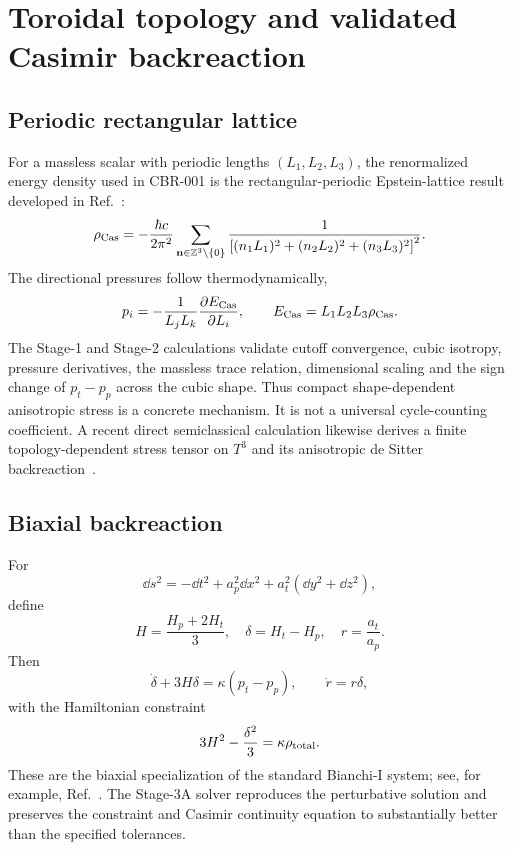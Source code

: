\section{Toroidal topology and validated Casimir backreaction}

\subsection{Periodic rectangular lattice}

For a massless scalar with periodic lengths $(L_1,L_2,L_3)$, the renormalized
energy density used in CBR-001 is the rectangular-periodic Epstein-lattice
result developed in Ref.~\cite{edery2006}:
\begin{equation}
 \rho_{\rm Cas}=-\frac{\hbar c}{2\pi^2}
 \sum_{\mathbf n\in\mathbb Z^3\setminus\{0\}}
 \frac{1}{\left[(n_1L_1)^2+(n_2L_2)^2+(n_3L_3)^2\right]^2}.
 \label{eq:casimir-lattice}
\end{equation}
The directional pressures follow thermodynamically,
\begin{equation}
 p_i=-\frac{1}{L_jL_k}\frac{\partial E_{\rm Cas}}{\partial L_i},
 \qquad E_{\rm Cas}=L_1L_2L_3\rho_{\rm Cas}.
 \label{eq:casimir-pressure}
\end{equation}
The Stage-1 and Stage-2 calculations validate cutoff convergence, cubic
isotropy, pressure derivatives, the massless trace relation, dimensional
scaling and the sign change of $p_t-p_p$ across the cubic shape.  Thus compact
shape-dependent anisotropic stress is a concrete mechanism.  It is not a
universal cycle-counting coefficient.  A recent direct semiclassical
calculation likewise derives a finite topology-dependent stress tensor on
$T^3$ and its anisotropic de Sitter backreaction~\cite{negro2026}.

\subsection{Biaxial backreaction}

For
\begin{equation}
 \dd s^2=-\dd t^2+a_p^2\dd x^2+a_t^2(\dd y^2+\dd z^2),
\end{equation}
define
\begin{equation}
 H=\frac{H_p+2H_t}{3},
 \quad
 \delta=H_t-H_p,
 \quad
 r=\frac{a_t}{a_p}.
\end{equation}
Then
\begin{equation}
 \dot\delta+3H\delta=\kappa(p_t-p_p),
 \qquad
 \dot r=r\delta,
 \label{eq:shear-system}
\end{equation}
with the Hamiltonian constraint
\begin{equation}
 3H^2-\frac{\delta^2}{3}=\kappa\rho_{\rm total}.
 \label{eq:hamiltonian-biaxial}
\end{equation}
These are the biaxial specialization of the standard Bianchi-I system; see,
for example, Ref.~\cite{ellismaccallum1969}.
The Stage-3A solver reproduces the perturbative solution and preserves the
constraint and Casimir continuity equation to substantially better than the
specified tolerances.

